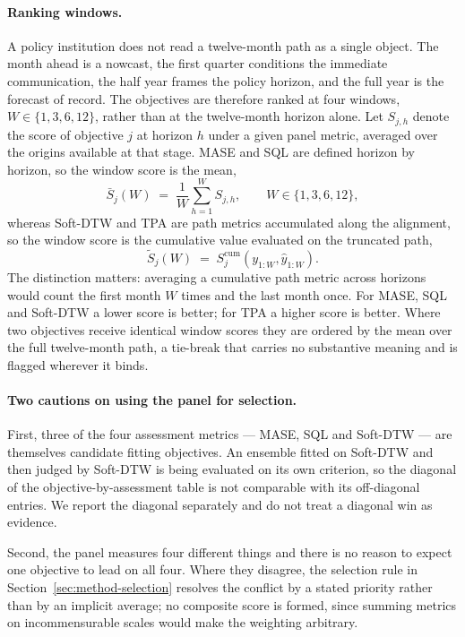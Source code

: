 \documentclass[12pt]{article}
\begin{document}
\paragraph{Ranking windows.}
A policy institution does not read a twelve-month path as a single object. The
month ahead is a nowcast, the first quarter conditions the immediate
communication, the half year frames the policy horizon, and the full year is
the forecast of record. The objectives are therefore ranked at four windows,
$W \in \{1,3,6,12\}$, rather than at the twelve-month horizon alone. Let
$S_{j,h}$ denote the score of objective $j$ at horizon $h$ under a given panel
metric, averaged over the origins available at that stage. MASE and SQL are defined horizon by
horizon, so the window score is the mean,
\begin{equation}
\bar{S}_j(W) \;=\; \frac{1}{W}\sum_{h=1}^{W} S_{j,h},
\qquad W \in \{1,3,6,12\},
\label{eq:window-mean}
\end{equation}
whereas Soft-DTW and TPA are path metrics accumulated along the alignment, so
the window score is the cumulative value evaluated on the truncated path,
\begin{equation}
\tilde{S}_j(W) \;=\; S_j^{\mathrm{cum}}\!\left(y_{1:W},\hat{y}_{1:W}\right).
\label{eq:window-cum}
\end{equation}
The distinction matters: averaging a cumulative path metric across horizons
would count the first month $W$ times and the last month once. For MASE, SQL
and Soft-DTW a lower score is better; for TPA a higher score is better. Where
two objectives receive identical window scores they are ordered by the mean
over the full twelve-month path, a tie-break that carries no substantive
meaning and is flagged wherever it binds.

\paragraph{Two cautions on using the panel for selection.}
First, three of the four assessment metrics --- MASE, SQL and Soft-DTW --- are
themselves candidate fitting objectives. An ensemble fitted on Soft-DTW and then
judged by Soft-DTW is being evaluated on its own criterion, so the diagonal of
the objective-by-assessment table is not comparable with its off-diagonal
entries. We report the diagonal separately and do not treat a diagonal win as
evidence.

Second, the panel measures four different things and there is no reason to expect
one objective to lead on all four. Where they disagree, the selection rule in
Section~\ref{sec:method-selection} resolves the conflict by a stated priority
rather than by an implicit average; no composite score is formed, since summing
metrics on incommensurable scales would make the weighting arbitrary.
\end{document}
